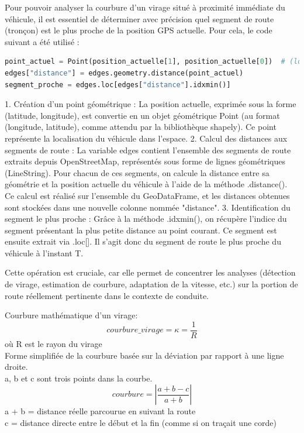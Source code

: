 Pour pouvoir analyser la courbure d’un virage situé à proximité immédiate du véhicule, il est essentiel de déterminer avec précision quel segment de route (tronçon) est le plus proche de la position GPS actuelle. Pour cela, le code suivant a été utilisé :
\begin{lstlisting}[language=Python, caption={Calcul de points}]
point_actuel = Point(position_actuelle[1], position_actuelle[0])  # (longitude, latitude)
edges["distance"] = edges.geometry.distance(point_actuel)
segment_proche = edges.loc[edges["distance"].idxmin()]
\end{lstlisting}
	1.	Création d’un point géométrique :
La position actuelle, exprimée sous la forme (latitude, longitude), est convertie en un objet géométrique Point (au format (longitude, latitude), comme attendu par la bibliothèque shapely). Ce point représente la localisation du véhicule dans l’espace.
	2.	Calcul des distances aux segments de route :
La variable edges contient l’ensemble des segments de route extraits depuis OpenStreetMap, représentés sous forme de lignes géométriques (LineString). Pour chacun de ces segments, on calcule la distance entre sa géométrie et la position actuelle du véhicule à l’aide de la méthode .distance(). Ce calcul est réalisé sur l’ensemble du GeoDataFrame, et les distances obtenues sont stockées dans une nouvelle colonne nommée "distance".
	3.	Identification du segment le plus proche :
Grâce à la méthode .idxmin(), on récupère l’indice du segment présentant la plus petite distance au point courant. Ce segment est ensuite extrait via .loc[]. Il s’agit donc du segment de route le plus proche du véhicule à l’instant T.

Cette opération est cruciale, car elle permet de concentrer les analyses (détection de virage, estimation de courbure, adaptation de la vitesse, etc.) sur la portion de route réellement pertinente dans le contexte de conduite.

\begin{tcolorbox}[title=Calcul de la courbure]
Courbure mathématique\cite{formule_curvature} d’un virage:
\[
courbure\_virage = \kappa = \frac{1}{R}
\]
où R est le rayon du virage\\
Forme simplifiée de la courbure basée sur la déviation par rapport à une ligne droite.\\
a, b et c sont trois points dans la courbe.\\
\[
courbure = \left| \frac{a + b - c}{a + b} \right|
\]
a + b = distance réelle parcourue en suivant la route \\
c = distance directe entre le début et la fin (comme si on traçait une corde)
\end{tcolorbox}


